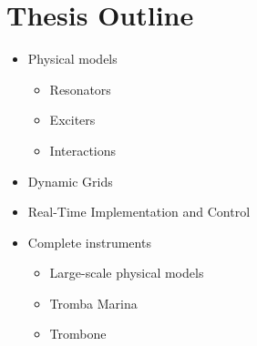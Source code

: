 \section{Thesis Outline}
\begin{itemize}
    \item Physical models
    \begin{itemize}
        \item Resonators
        \item Exciters
        \item Interactions
    \end{itemize}
    \item Dynamic Grids
    \item Real-Time Implementation and Control
    \item Complete instruments
    \begin{itemize}
        \item Large-scale physical models
        \item Tromba Marina
        \item Trombone
    \end{itemize}
\end{itemize}